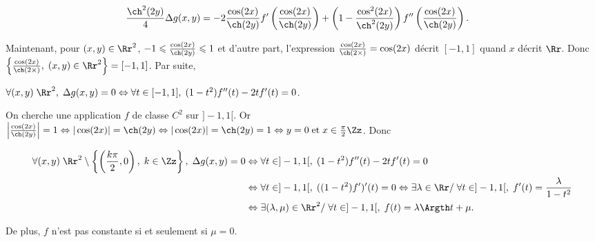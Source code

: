 {{\begin{align*}\ensuremath
 \frac{\ch^2(2y)}{4}\Delta g(x,y)&=-2 \frac{\cos(2x)}{\ch(2y)}f'\left( \frac{\cos(2x)}{\ch(2y)}\right)+\left(1- \frac{\cos^2(2x)}{\ch^2(2y)}\right)f''\left( \frac{\cos(2x)}{\ch(2y)}\right).
\end{align*}

Maintenant, pour $(x,y)\in\Rr^2$, $-1\leqslant  \frac{\cos(2x)}{\ch(2y)}\leqslant1$ et d'autre part, l'expression  $ \frac{\cos(2x)}{\ch(2\times)}=\cos(2x)$ décrit $[-1,1]$ quand $x$ décrit $\Rr$. Donc $\left\{ \frac{\cos(2x)}{\ch(2\times)},\;(x,y)\in\Rr^2\right\}=[-1,1]$. Par suite,

\begin{center}
$\forall(x,y)\;\Rr^2,\;\Delta g(x,y)=0\Leftrightarrow\forall t\in[-1,1],\;(1-t^2)f''(t)-2tf'(t)=0$.
\end{center}

On cherche une application $f$ de classe $C^2$ sur $]-1,1[$. Or $\left| \frac{\cos(2x)}{\ch(2y)}\right|=1\Leftrightarrow|\cos(2x)|=\ch(2y)\Leftrightarrow|\cos(2x)|=\ch(2y)=1\Leftrightarrow y=0\;\text{et}\;x\in \frac{\pi}{2}\Zz$. Donc

\begin{align*}\ensuremath
\forall(x,y)\;\Rr^2\setminus\left\{\left( \frac{k\pi}{2},0\right),\;k\in\Zz\right\},\;\Delta g(x,y)=0&\Leftrightarrow\forall t\in]-1,1[,\;(1-t^2)f''(t)-2tf'(t)=0\\
 &\Leftrightarrow\forall t\in]-1,1[,\;((1-t^2)f')'(t)=0\Leftrightarrow\exists\lambda\in\Rr/\;\forall t\in]-1,1[,\;f'(t)= \frac{\lambda}{1-t^2}\\
 &\Leftrightarrow\exists(\lambda,\mu)\in\Rr^2/\;\forall t\in]-1,1[,\;f(t)=\lambda\Argth t+\mu.
\end{align*}

De plus, $f$ n'est pas constante si et seulement si $\mu=0$.

\begin{center}
\end{center}
}
}
